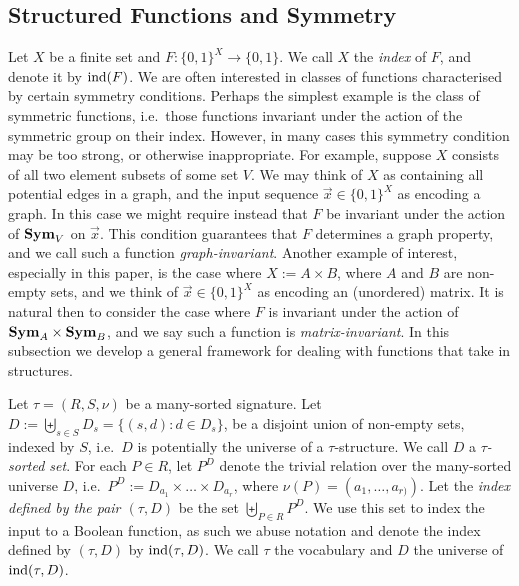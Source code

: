 \documentclass[../paper.tex]{subfiles}
\begin{document}


\subsection{Structured Functions and Symmetry}
Let $X$ be a finite set and $F: \{0,1\}^{X} \rightarrow \{0,1\}$. We call $X$
the \emph{index} of $F$, and denote it by $\text{\upshape ind}(F)$. We are often interested in
classes of functions characterised by certain symmetry conditions. Perhaps the
simplest example is the class of symmetric functions, i.e.\ those functions
invariant under the action of the symmetric group on their index. However, in
many cases this symmetry condition may be too strong, or otherwise
inappropriate. For example, suppose $X$ consists of all two element subsets of
some set $V$. We may think of $X$ as containing all potential edges in a graph,
and the input sequence $ \vec{x} \in \{0,1\}^X$ as encoding a graph. In this
case we might require instead that $F$ be invariant under the action of $\text{\textbf{Sym}}_V$
on $\vec{x}$. This condition guarantees that $F$ determines a graph property,
and we call such a function \emph{graph-invariant}. Another example of interest,
especially in this paper, is the case where $X := A \times B$, where $A$ and $B$
are non-empty sets, and we think of $\vec{x} \in \{0,1\}^X$ as encoding an
(unordered) matrix. It is natural then to consider the case where $F$ is
invariant under the action of $\text{\textbf{Sym}}_A \times \text{\textbf{Sym}}_B$, and we say such a function
is \emph{matrix-invariant}. In this subsection we develop a general framework
for dealing with functions that take in structures.

Let $\tau = (R, S, \nu)$ be a many-sorted signature.
Let $D := \biguplus_{s \in S} D_{s} = \{(s,d) : d \in D_s\}$, be a disjoint
union of non-empty sets, indexed by $S$, i.e.\ $D$ is potentially the universe
of a $\tau$-structure. We call $D$ a \emph{$\tau$-sorted set}. For each $P \in
R$, let $P^D$ denote the trivial relation over the many-sorted universe $D$,
i.e.\ $P^D := D_{a_1} \times \ldots \times D_{a_{r}}$, where $\nu(P) = (a_1,
\ldots , a_{r)})$. Let the \emph{index defined by the pair $(\tau, D)$} be the
set $\biguplus_{P\in R} P^{D}$. We use this set to index the input to a Boolean
function, as such we abuse notation and denote the index defined by $(\tau, D)$
by $\text{\upshape ind}(\tau, D)$. We call $\tau$ the vocabulary and $D$ the universe of
$\text{\upshape ind}(\tau, D)$.
\end{document}
